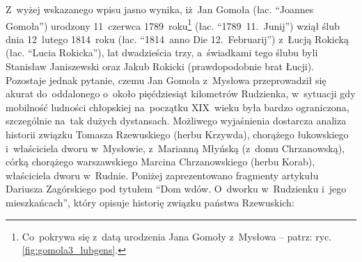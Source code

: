 Z~wyżej wskazanego wpisu jasno wynika, iż~Jan
Gomoła (łac. \enquote{Joannes Gomoła})
urodzony 11~czerwca 1789~roku\footnote{Co~pokrywa się z~datą urodzenia Jana
Gomoły z~Mysłowa -- patrz: ryc. \ref{fig:gomola3_lubgens}.} (łac.
\enquote{1789~11.~Junij}) wziął ślub dnia  12~lutego 1814~roku (łac.
\enquote{1814~anno Die 12.~Februarij}) z~Łucją 
Rokicką (łac.
\enquote{Lucia Rokicka}), lat dwadzieścia trzy, a~świadkami tego ślubu byli
Stanisław Janiszewski oraz Jakub Rokicki (prawdopodobnie brat Łucji).
Pozostaje jednak pytanie, czemu Jan Gomoła z~Mysłowa przeprowadził się akurat
do~oddalonego o~około pięćdziesiąt kilometrów Rudzienka, w~sytuacji gdy
mobilność ludności chłopskiej na~początku XIX~wieku była bardzo ograniczona,
szczególnie na~tak dużych dystansach. Możliwego wyjaśnienia dostarcza
analiza historii związku Tomasza Rzewuskiego (herbu Krzywda), chorążego
łukowskiego i~właściciela dworu w~Mysłowie, z~Marianną Młyńską (z~domu
Chrzanowską), córką chorążego warszawskiego Marcina Chrzanowskiego (herbu
Korab), właściciela dworu w~Rudnie. Poniżej zaprezentowano fragmenty artykułu
Dariusza Zagórskiego pod tytułem \enquote{Dom wdów. O~dworku w~Rudzienku
i~jego mieszkańcach}, który opisuje historię związku państwa Rzewuskich:

